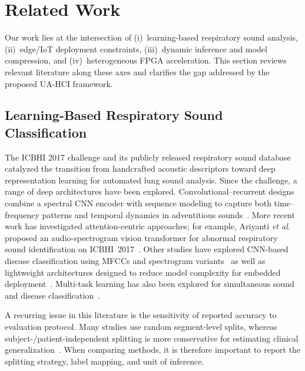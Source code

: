 \section{Related Work}
\label{sec:relatedwork}

Our work lies at the intersection of (i)~learning-based respiratory sound analysis, (ii)~edge/IoT deployment constraints, (iii)~dynamic inference and model compression, and (iv)~heterogeneous FPGA acceleration. This section reviews relevant literature along these axes and clarifies the gap addressed by the proposed UA-HCI framework.

\subsection{Learning-Based Respiratory Sound Classification}
The ICBHI 2017 challenge and its publicly released respiratory sound database~\cite{b16} catalyzed the transition from handcrafted acoustic descriptors toward deep representation learning for automated lung sound analysis. Since the challenge, a range of deep architectures have been explored. Convolutional--recurrent designs combine a spectral CNN encoder with sequence modeling to capture both time--frequency patterns and temporal dynamics in adventitious sounds~\cite{noureddine2020}. More recent work has investigated attention-centric approaches; for example, Ariyanti \textit{et al.} proposed an audio-spectrogram vision transformer for abnormal respiratory sound identification on ICBHI~2017~\cite{b07}. Other studies have explored CNN-based disease classification using MFCCs and spectrogram variants~\cite{b08,b10,b12,b43,b45} as well as lightweight architectures designed to reduce model complexity for embedded deployment~\cite{b13,b14}. Multi-task learning has also been explored for simultaneous sound and disease classification~\cite{b15}.

A recurring issue in this literature is the sensitivity of reported accuracy to evaluation protocol. Many studies use random segment-level splits, whereas subject-/patient-independent splitting is more conservative for estimating clinical generalization~\cite{b16}. When comparing methods, it is therefore important to report the splitting strategy, label mapping, and unit of inference.

